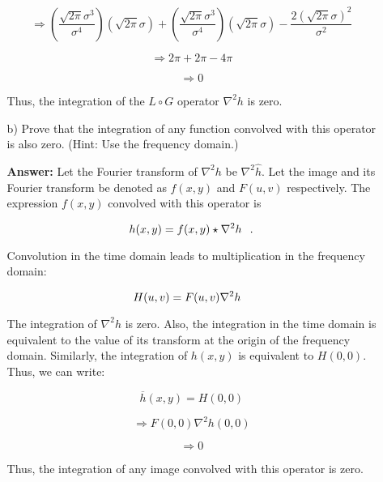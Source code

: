\documentclass{article}
\begin{document}
\begin{enumerate}
\begin{enumerate}
\begin{equation}
\Rightarrow \left( \frac{\sqrt{2 \pi} \sigma ^ 3}{\sigma ^ 4} \right) \left( \sqrt{2 \pi} \sigma \right) + \left( \frac{\sqrt{2 \pi} \sigma ^ 3}{\sigma ^ 4} \right) \left( \sqrt{2 \pi} \sigma \right) - \frac{2(\sqrt{2 \pi} \sigma) ^ 2}{\sigma ^ 2}
\end{equation}

\begin{equation}
\Rightarrow 2\pi + 2 \pi - 4 \pi
\end{equation}

\begin{equation}
\Rightarrow 0
\end{equation}

Thus, the integration of the $L \circ G$ operator $\nabla^2 h$ is zero.

\item[b)] Prove that the integration of any function convolved with this operator is also zero. (Hint: Use the frequency domain.)

\textbf{Answer: }Let the Fourier transform of $\nabla^2 h$ be $\nabla^2 \hat h$. Let the image and its Fourier transform be denoted as $f(x,y)$ and $F(u,v)$ respectively. The expression $f(x,y)$ convolved with this operator
is 

$$h(x,y) = f(x,y) \star \nabla^2 h \hspace{0.1in} .$$

Convolution in the time domain leads to multiplication in the frequency domain:

$$H(u,v) = F(u,v) \nabla^2 h \hspace{0.1in}$$

The integration of $\nabla^2 h$ is zero. Also, the integration in the time domain is equivalent to the value of its transform at the origin of the frequency domain.  Similarly, the integration of $h(x,y)$ is equivalent to $H(0,0)$.
Thus, we can write:

\begin{equation}
\overline{h}(x,y) = H(0,0)
\end{equation}

\begin{equation}
\Rightarrow F(0,0)\nabla^2 h(0,0)
\end{equation}

\begin{equation}
\Rightarrow 0
\end{equation}

Thus, the integration of any image convolved with this operator is zero.


\end{enumerate}
\end{enumerate}
\end{document}
